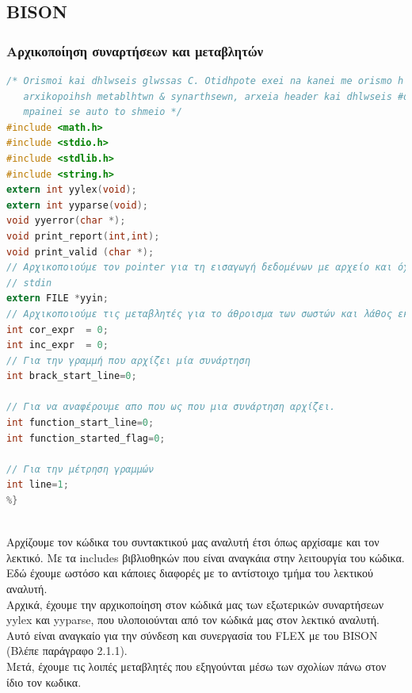 \documentclass[14pt]{extarticle}
\begin{document}
\subsection{BISON}

\subsubsection{Αρχικοποίηση συναρτήσεων και μεταβλητών}
\begin{lstlisting}[language=C]
%{
/* Orismoi kai dhlwseis glwssas C. Otidhpote exei na kanei me orismo h
   arxikopoihsh metablhtwn & synarthsewn, arxeia header kai dhlwseis #define
   mpainei se auto to shmeio */
#include <math.h>
#include <stdio.h>
#include <stdlib.h>
#include <string.h>
extern int yylex(void);
extern int yyparse(void);
void yyerror(char *);
void print_report(int,int);
void print_valid (char *);
// Αρχικοποιούμε τον pointer για τη εισαγωγή δεδομένων με αρχείο και όχι απο το
// stdin
extern FILE *yyin;
// Αρχικοποιούμε τις μεταβλητές για το άθροισμα των σωστών και λάθος εκφράσεων
int cor_expr  = 0;
int inc_expr  = 0;
// Για την γραμμή που αρχίζει μία συνάρτηση
int brack_start_line=0;

// Για να αναφέρουμε απο που ως που μια συνάρτηση αρχίζει.
int function_start_line=0;
int function_started_flag=0;

// Για την μέτρηση γραμμών
int line=1;
%}
\end{lstlisting}
\\
Αρχίζουμε τον κώδικα του συντακτικού μας αναλυτή έτσι όπως αρχίσαμε και τον λεκτικό.
Με τα includes βιβλιοθηκών που είναι αναγκάια στην λειτουργία του κώδικα.
\\
Εδώ έχουμε ωστόσο και κάποιες διαφορές με το αντίστοιχο τμήμα του λεκτικού αναλυτή.
\\
Αρχικά, έχουμε την αρχικοποίηση στον κώδικά μας των εξωτερικών συναρτήσεων yylex
και yyparse, που υλοποιούνται από τον κώδικά μας στον λεκτικό αναλυτή. Αυτό 
είναι αναγκαίο για την σύνδεση και συνεργασία του FLEX με του BISON (Βλέπε παράγραφο
2.1.1).
\\
Μετά, έχουμε τις λοιπές μεταβλητές που εξηγούνται μέσω των σχολίων πάνω στον
ίδιο τον κωδικα.
\end{document}
